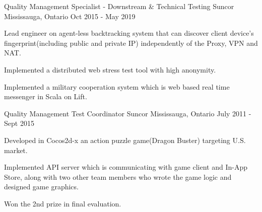 \begin{cventries}
  \cventry
    {Quality Management Specialist - Downstream \& Technical Testing} %
    {Suncor} %
    {Mississauga, Ontario} %
    {Oct 2015 - May 2019} %
    {
      \begin{cvitems} %
        \item {Lead engineer on agent-less backtracking system that can discover client device's fingerprint(including public and private IP) independently of the Proxy, VPN and NAT.}
        \item {Implemented a distributed web stress test tool with high anonymity.}
        \item {Implemented a military cooperation system which is web based real time messenger in Scala on Lift.}
      \end{cvitems}
    }

  \cventry
    {Quality Management Test Coordinator} %
    {Suncor} %
    {Mississauga, Ontario} %
    {July 2011 - Sept 2015} %
    {
      \begin{cvitems} %
        \item {Developed in Cocos2d-x an action puzzle game(Dragon Buster) targeting U.S. market.}
        \item {Implemented API server which is communicating with game client and In-App Store, along with two other team members who wrote the game logic and designed game graphics.}
        \item {Won the 2nd prize in final evaluation.}
      \end{cvitems}
    }


\end{cventries}
